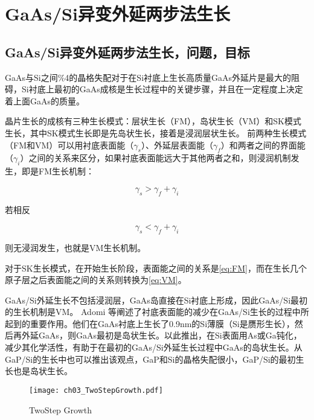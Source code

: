 % 

\chapter{GaAs/Si异变外延两步法生长}

\section{GaAs/Si异变外延两步法生长，问题，目标}

GaAs与Si之间\%4的晶格失配对于在Si衬底上生长高质量GaAs外延片是最大的阻碍，Si衬底上最初的GaAs成核是生长过程中的关键步骤，并且在一定程度上决定着上面GaAs的质量。

晶片生长的成核有三种生长模式：层状生长（FM），岛状生长（VM）和SK模式生长，其中SK模式生长即是先岛状生长，接着是浸润层状生长。
前两种生长模式（FM和VM）可以用衬底表面能（$ \gamma_{s}$）、外延层表面能（$\gamma_{f}$）和两者之间的界面能（$\gamma_{i}$）之间的关系来区分，如果衬底表面能远大于其他两者之和，则浸润机制发生，即是FM生长机制：

\begin{equation}
	\label{eq:FM}
 	\gamma_{s} > \gamma_{f} + \gamma_{i}
\end{equation}

若相反

\begin{equation}
	\label{eq:VM}
 	\gamma_{s} < \gamma_{f} + \gamma_{i}
\end{equation}

则无浸润发生，也就是VM生长机制。

对于SK生长模式，在开始生长阶段，表面能之间的关系是\ref{eq:FM}，而在生长几个原子层之后表面能之间的关系则转换为\ref{eq:VM}。

GaAs/Si外延生长不包括浸润层，GaAs岛直接在Si衬底上形成，因此GaAs/Si最初的生长机制是VM。
Adomi 等阐述了衬底表面能的减少在GaAs/Si生长的过程中所起到的重要作用。他们在GaAs衬底上生长了0.9nm的Si薄膜（Si是赝形生长），然后再外延GaAs，则GaAs最初是岛状生长。以此推出，在Si表面用As或Ga钝化，减少其化学活性，有助于在最初的GaAs/Si外延生长过程中GaAs的岛状生长。从GaP/Si的生长中也可以推出该观点，GaP和Si的晶格失配很小，GaP/Si的最初生长也是岛状生长。


\begin{figure}[ht]
	\centering
	\texttt{[image: ch03\_TwoStepGrowth.pdf]}
	\caption{TwoStep Growth}
	\label{fig:TwoStepGrowth}
\end{figure}

